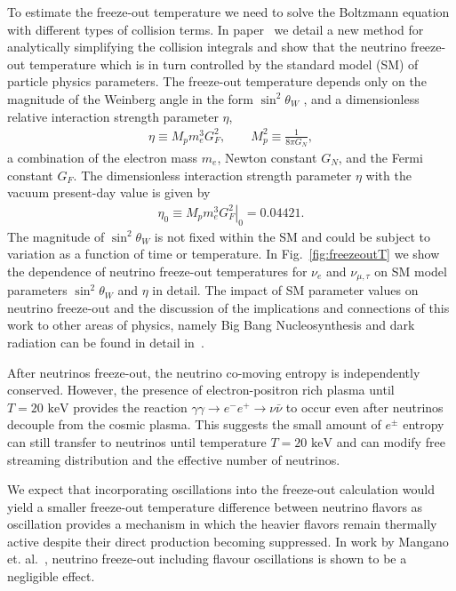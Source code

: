 \documentclass[universe,article,submit,moreauthors,pdftex,a4paper]{Definitions/mdpi}
\newcommand{\keV}{\text{ keV}}
\newcommand*{\rf}[1]{Fig.~{\ref{#1}}}
\begin{document}
 To estimate the freeze-out temperature we need to solve the Boltzmann equation with different types of collision terms. In paper~\cite{Birrell:2014uka} we detail a new method for analytically simplifying the collision integrals and show that the neutrino freeze-out temperature which is in turn controlled by the standard model (SM) of particle physics parameters. The freeze-out temperature depends only on the magnitude of the Weinberg angle in the form $\sin^2\theta_W$ , and a dimensionless relative interaction strength parameter $\eta$,
\begin{align}
\eta\equiv M_p m_e^3 G_F^2, \qquad M_p^2\equiv \frac{1}{8\pi G_N}, \end{align}
a combination of the electron mass $m_e$, Newton constant $G_N$, and the Fermi constant $G_F$. The dimensionless interaction strength parameter $\eta$ with the vacuum present-day value is given by
\begin{align}
\eta_0\equiv \left.M_p m_e^3 G_F^2\right|_0 = 0.04421 .
\end{align}
The magnitude of $\sin^2\theta_W$ is not fixed within the SM and could be subject to variation as a function of time or temperature. In \rf{fig:freezeoutT} we show the dependence of neutrino freeze-out temperatures for $\nu_e$ and $\nu_{\mu,\tau}$ on SM model parameters $\sin^2\theta_W$ and $\eta$ in detail. The impact of SM parameter values on neutrino freeze-out and the discussion of the implications and connections of this work to other areas of physics, namely Big Bang Nucleosynthesis and dark radiation can be found in detail in~\cite{Dreiner:2011fp,Boehm:2012gr,Blennow:2012de,Birrell:2014uka}.

After neutrinos freeze-out, the neutrino co-moving entropy is independently conserved. However, the presence of electron-positron rich plasma until $T=20\keV$ provides the reaction $\gamma\gamma\to e^-e^+\to\nu\bar{\nu}$ to occur even after neutrinos decouple from the cosmic plasma. This suggests the small amount of $e^\pm$ entropy can still transfer to neutrinos until temperature $T=20\keV$ and can modify free streaming distribution and the effective number of neutrinos.

We expect that incorporating oscillations into the freeze-out calculation would yield a smaller freeze-out temperature difference between neutrino flavors as oscillation provides a mechanism in which the heavier flavors remain thermally active despite their direct production becoming suppressed. In work by Mangano et. al.~\cite{Mangano:2005cc}, neutrino freeze-out including flavour oscillations is shown to be a negligible effect.
\end{document}
